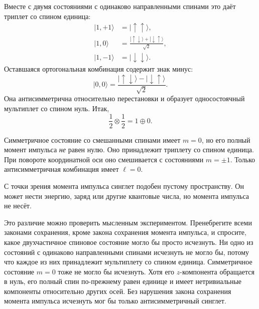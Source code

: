 Вместе с двумя состояниями с одинаково направленными спинами это даёт триплет со спином единица:
\begin{align}
|1,+1\rangle &=|\uparrow\uparrow\rangle,\\
|1,0\rangle &=
\frac{|\uparrow\downarrow\rangle
      +|\downarrow\uparrow\rangle}{\sqrt2},\\
|1,-1\rangle &=|\downarrow\downarrow\rangle.
\end{align}
Оставшаяся ортогональная комбинация содержит знак минус:
\begin{equation}
|0,0\rangle
=
\frac{|\uparrow\downarrow\rangle
      -|\downarrow\uparrow\rangle}{\sqrt2}.
\end{equation}
Она антисимметрична относительно перестановки и образует односостоячный мультиплет со спином нуль. Итак,
\begin{equation}
\frac12\otimes\frac12=1\oplus0.
\end{equation}

Симметричное состояние со смешанными спинами имеет \(m=0\), но его полный момент импульса \emph{не} равен нулю. Оно принадлежит триплету со спином единица. При повороте координатной оси оно смешивается с состояниями \(m=\pm1\). Только антисимметричная комбинация имеет \(\ell=0\).

С точки зрения момента импульса синглет подобен пустому пространству. Он может нести энергию, заряд или другие квантовые числа, но момента импульса не несёт.

Это различие можно проверить мысленным экспериментом. Пренебрегите всеми законами сохранения, кроме закона сохранения момента импульса, и спросите, какое двухчастичное спиновое состояние могло бы просто исчезнуть. Ни одно из состояний с одинаково направленными спинами исчезнуть не могло бы, потому что каждое из них принадлежит мультиплету со спином единица. Симметричное состояние \(m=0\) тоже не могло бы исчезнуть. Хотя его \(z\)-компонента обращается в нуль, его полный спин по-прежнему равен единице и имеет нетривиальные компоненты относительно других осей. Без нарушения закона сохранения момента импульса исчезнуть мог бы только антисимметричный синглет.

\begin{classroomqa}
\end{classroomqa}

